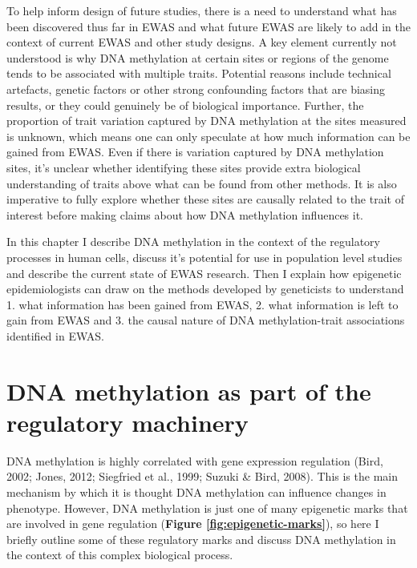\documentclass[11pt,twoside]{bristolthesis}
\begin{document}
To help inform design of future studies, there is a need to understand what has been discovered thus far in EWAS and what future EWAS are likely to add in the context of current EWAS and other study designs. A key element currently not understood is why DNA methylation at certain sites or regions of the genome tends to be associated with multiple traits. Potential reasons include technical artefacts, genetic factors or other strong confounding factors that are biasing results, or they could genuinely be of biological importance. Further, the proportion of trait variation captured by DNA methylation at the sites measured is unknown, which means one can only speculate at how much information can be gained from EWAS. Even if there is variation captured by DNA methylation sites, it's unclear whether identifying these sites provide extra biological understanding of traits above what can be found from other methods. It is also imperative to fully explore whether these sites are causally related to the trait of interest before making claims about how DNA methylation influences it.

In this chapter I describe DNA methylation in the context of the regulatory processes in human cells, discuss it's potential for use in population level studies and describe the current state of EWAS research. Then I explain how epigenetic epidemiologists can draw on the methods developed by geneticists to understand 1. what information has been gained from EWAS, 2. what information is left to gain from EWAS and 3. the causal nature of DNA methylation-trait associations identified in EWAS.

\hypertarget{dna-methylation-as-part-of-the-regulatory-machinery}{%
\section{DNA methylation as part of the regulatory machinery}\label{dna-methylation-as-part-of-the-regulatory-machinery}}

DNA methylation is highly correlated with gene expression regulation (Bird, 2002; Jones, 2012; Siegfried et al., 1999; Suzuki \& Bird, 2008). This is the main mechanism by which it is thought DNA methylation can influence changes in phenotype. However, DNA methylation is just one of many epigenetic marks that are involved in gene regulation (\textbf{Figure \ref{fig:epigenetic-marks}}), so here I briefly outline some of these regulatory marks and discuss DNA methylation in the context of this complex biological process.
\end{document}
